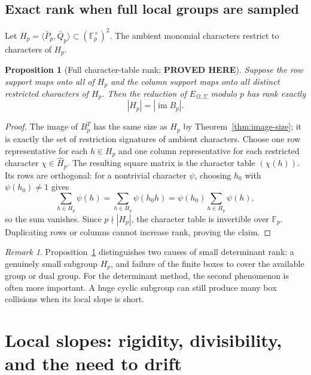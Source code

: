 \documentclass[11pt]{article}
\newtheorem{proposition}[theorem]{Proposition}
\theoremstyle{definition}
\theoremstyle{remark}
\newtheorem{remark}[theorem]{Remark}
\newcommand{\F}{\mathbb F}
\newcommand{\im}{\operatorname{im}}
\newcommand{\statusproved}{\textcolor{statusgreen}{\textbf{PROVED HERE}}}
\begin{document}
\subsection{Exact rank when full local groups are sampled}

Let $H_p=\langle\bar P_p,\bar Q_p\rangle\subset(\F_p^\times)^2$.  The ambient monomial characters restrict to characters of $H_p$.

\begin{proposition}[Full character-table rank; \statusproved]\label{prop:character-rank}
Suppose the row support maps onto all of $H_p$ and the column support maps onto all distinct restricted characters of $H_p$.  Then the reduction of $E_{\Omega,\Sigma}$ modulo $p$ has rank exactly
\[
|H_p|=|\im B_p|.
\]
\end{proposition}

\begin{proof}
The image of $B_p^T$ has the same size as $H_p$ by Theorem~\ref{thm:image-size}; it is exactly the set of restriction signatures of ambient characters.  Choose one row representative for each $h\in H_p$ and one column representative for each restricted character $\chi\in\widehat H_p$.  The resulting square matrix is the character table $(\chi(h))$.  Its rows are orthogonal: for a nontrivial character $\psi$, choosing $h_0$ with $\psi(h_0)\ne1$ gives
\[
\sum_{h\in H_p}\psi(h)
=\sum_{h\in H_p}\psi(h_0h)
=\psi(h_0)\sum_{h\in H_p}\psi(h),
\]
so the sum vanishes.  Since $p\nmid|H_p|$, the character table is invertible over $\F_p$.  Duplicating rows or columns cannot increase rank, proving the claim.
\end{proof}

\begin{remark}
Proposition~\ref{prop:character-rank} distinguishes two causes of small determinant rank: a genuinely small subgroup $H_p$, and failure of the finite boxes to cover the available group or dual group.  For the determinant method, the second phenomenon is often more important.  A huge cyclic subgroup can still produce many box collisions when its local slope is short.
\end{remark}

\section{Local slopes: rigidity, divisibility, and the need to drift}
\label{sec:slopes}
\end{document}
